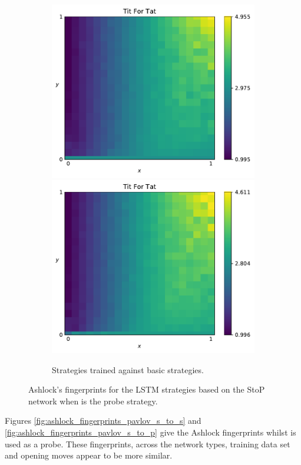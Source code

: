 \begin{figure}[!htbp]
\begin{subfigure}{\textwidth}
        \includegraphics[width=.3\textwidth]{src/chapters/07/img/tit_for_tat_basic_classification_1.pdf}
        \includegraphics[width=.3\textwidth]{src/chapters/07/img/tit_for_tat_basic_classification_0_78.pdf}
        \caption{Strategies trained against basic strategies.}
    \end{subfigure}
    \caption{Ashlock's fingerprints for the LSTM strategies based on the StoP
    network when \TitForTat is the probe strategy.}\label{fig:ashlock_fingerprints_tft_s_to_p}
\end{figure}

Figures \ref{fig:ashlock_fingerprints_pavlov_s_to_s} and
\ref{fig:ashlock_fingerprints_pavlov_s_to_p} give the Ashlock fingerprints
whilst \Pavlov is used as a probe. These fingerprints, across the network types,
training data set and opening moves appear to be more similar. 

